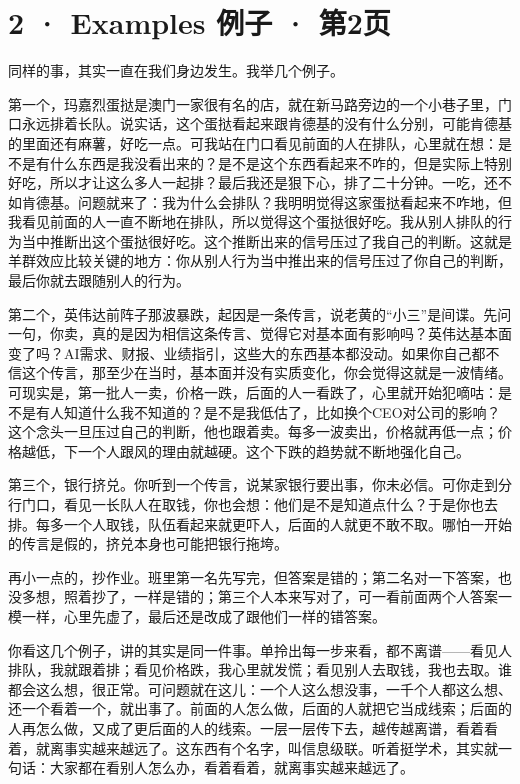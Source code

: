 \documentclass[11pt]{article}
\begin{document}
\section*{2 · Examples 例子 · 第2页}

同样的事，其实一直在我们身边发生。我举几个例子。\par

第一个，玛嘉烈蛋挞是澳门一家很有名的店，就在新马路旁边的一个小巷子里，门口永远排着长队。说实话，这个蛋挞看起来跟肯德基的没有什么分别，可能肯德基的里面还有麻薯，好吃一点。可我站在门口看见前面的人在排队，心里就在想：是不是有什么东西是我没看出来的？是不是这个东西看起来不咋的，但是实际上特别好吃，所以才让这么多人一起排？最后我还是狠下心，排了二十分钟。一吃，还不如肯德基。问题就来了：我为什么会排队？我明明觉得这家蛋挞看起来不咋地，但我看见前面的人一直不断地在排队，所以觉得这个蛋挞很好吃。我从别人排队的行为当中推断出这个蛋挞很好吃。这个推断出来的信号压过了我自己的判断。这就是羊群效应比较关键的地方：你从别人行为当中推出来的信号压过了你自己的判断，最后你就去跟随别人的行为。\par

第二个，英伟达前阵子那波暴跌，起因是一条传言，说老黄的“小三”是间谍。先问一句，你卖，真的是因为相信这条传言、觉得它对基本面有影响吗？英伟达基本面变了吗？AI需求、财报、业绩指引，这些大的东西基本都没动。如果你自己都不信这个传言，那至少在当时，基本面并没有实质变化，你会觉得这就是一波情绪。可现实是，第一批人一卖，价格一跌，后面的人一看跌了，心里就开始犯嘀咕：是不是有人知道什么我不知道的？是不是我低估了，比如换个CEO对公司的影响？这个念头一旦压过自己的判断，他也跟着卖。每多一波卖出，价格就再低一点；价格越低，下一个人跟风的理由就越硬。这个下跌的趋势就不断地强化自己。\par

第三个，银行挤兑。你听到一个传言，说某家银行要出事，你未必信。可你走到分行门口，看见一长队人在取钱，你也会想：他们是不是知道点什么？于是你也去排。每多一个人取钱，队伍看起来就更吓人，后面的人就更不敢不取。哪怕一开始的传言是假的，挤兑本身也可能把银行拖垮。\par

再小一点的，抄作业。班里第一名先写完，但答案是错的；第二名对一下答案，也没多想，照着抄了，一样是错的；第三个人本来写对了，可一看前面两个人答案一模一样，心里先虚了，最后还是改成了跟他们一样的错答案。\par

你看这几个例子，讲的其实是同一件事。单拎出每一步来看，都不离谱——看见人排队，我就跟着排；看见价格跌，我心里就发慌；看见别人去取钱，我也去取。谁都会这么想，很正常。可问题就在这儿：一个人这么想没事，一千个人都这么想、还一个看着一个，就出事了。前面的人怎么做，后面的人就把它当成线索；后面的人再怎么做，又成了更后面的人的线索。一层一层传下去，越传越离谱，看着看着，就离事实越来越远了。这东西有个名字，叫信息级联。听着挺学术，其实就一句话：大家都在看别人怎么办，看着看着，就离事实越来越远了。\par
\end{document}
